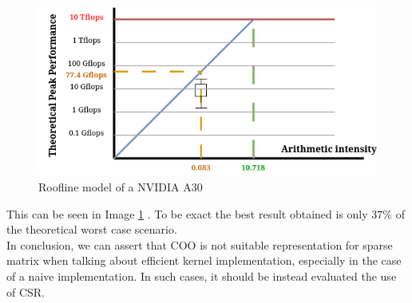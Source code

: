 \documentclass[conference]{IEEEtran}
\begin{document}
\begin{figure}[hbt!]
	\centering
	\includegraphics[width=1\linewidth]{data_images/roofline}
	\caption{Roofline model of a NVIDIA A30}
	\label{fig:roofline}
\end{figure}

This can be seen in Image \ref{fig:roofline} . To be exact the best result obtained is only $37\%$ of the theoretical worst case scenario.
\\

In conclusion, we can assert that COO is not suitable representation for sparse matrix when talking about efficient kernel implementation, especially in the case of a naive implementation. In such cases, it should be instead evaluated the use of CSR.
\end{document}
